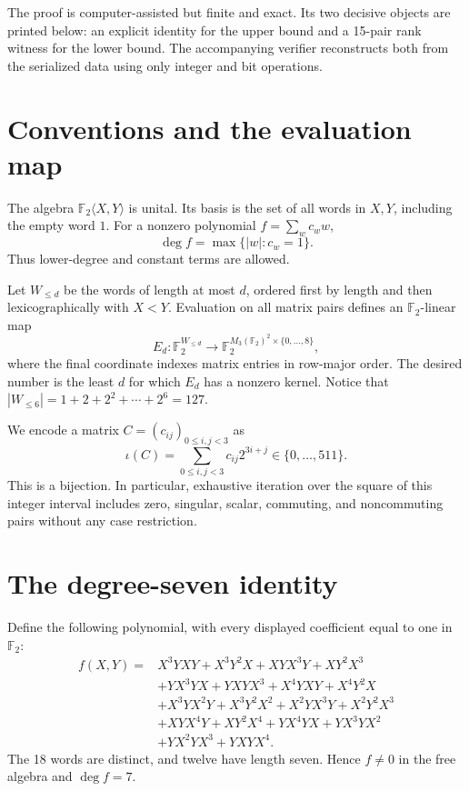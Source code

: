 \documentclass[11pt]{amsart}
\theoremstyle{definition}
\newcommand{\F}{\mathbb F}
\newcommand{\Mat}{M_3(\F_2)}
\begin{document}
The proof is computer-assisted but finite and exact.  Its two decisive objects
are printed below: an explicit identity for the upper bound and a 15-pair rank
witness for the lower bound.  The accompanying verifier reconstructs both from
the serialized data using only integer and bit operations.

\section{Conventions and the evaluation map}

The algebra \(\F_2\langle X,Y\rangle\) is unital.  Its basis is the set of all
words in \(X,Y\), including the empty word \(1\).  For a nonzero polynomial
\(f=\sum_w c_w w\),
\[
\deg f=\max\{|w|:c_w=1\}.
\]
Thus lower-degree and constant terms are allowed.

Let \(W_{\le d}\) be the words of length at most \(d\), ordered first by
length and then lexicographically with \(X<Y\).  Evaluation on all matrix pairs
defines an \(\F_2\)-linear map
\[
E_d:\F_2^{W_{\le d}}\longrightarrow
\F_2^{\Mat^2\times\{0,\ldots,8\}},
\]
where the final coordinate indexes matrix entries in row-major order.  The
desired number is the least \(d\) for which \(E_d\) has a nonzero kernel.
Notice that \(|W_{\le6}|=1+2+2^2+\cdots+2^6=127\).

We encode a matrix \(C=(c_{ij})_{0\le i,j<3}\) as
\begin{equation}\label{eq:encoding}
\iota(C)=\sum_{0\le i,j<3}c_{ij}2^{3i+j}\in\{0,\ldots,511\}.
\end{equation}
This is a bijection.  In particular, exhaustive iteration over the square of
this integer interval includes zero, singular, scalar, commuting, and
noncommuting pairs without any case restriction.

\section{The degree-seven identity}

Define the following polynomial, with every displayed coefficient equal to one
in \(\F_2\):
\begin{equation}\label{eq:identity}
\begin{aligned}
f(X,Y)={}&X^3YXY+X^3Y^2X+XYX^3Y+XY^2X^3\\
&+YX^3YX+YXYX^3+X^4YXY+X^4Y^2X\\
&+X^3YX^2Y+X^3Y^2X^2+X^2YX^3Y+X^2Y^2X^3\\
&+XYX^4Y+XY^2X^4+YX^4YX+YX^3YX^2\\
&+YX^2YX^3+YXYX^4.
\end{aligned}
\end{equation}
The 18 words are distinct, and twelve have length seven.  Hence \(f\ne0\) in
the free algebra and \(\deg f=7\).
\end{document}
